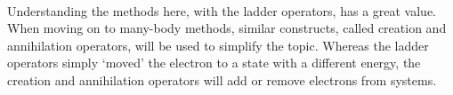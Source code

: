 \paragraph*{}
Understanding the methods here, with the ladder operators, has a great value.
When moving on to many-body methods, similar constructs, called creation and annihilation operators, will be used to simplify the topic.
Whereas the ladder operators simply `moved' the electron to a state with a different energy, the creation and annihilation operators will add or remove electrons from systems.













